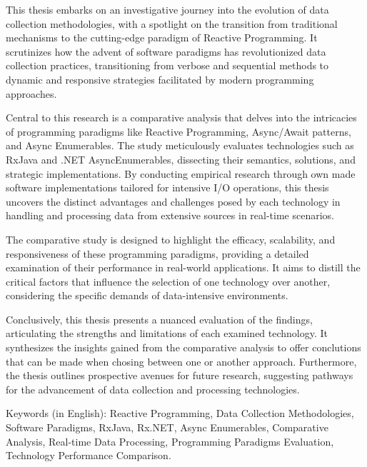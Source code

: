 \abstractEN %

This thesis embarks on an investigative journey into the evolution of data collection methodologies, with a spotlight on the transition from traditional mechanisms to the cutting-edge paradigm of Reactive Programming. It scrutinizes how the advent of software paradigms has revolutionized data collection practices, transitioning from verbose and sequential methods to dynamic and responsive strategies facilitated by modern programming approaches.

Central to this research is a comparative analysis that delves into the intricacies of programming paradigms like Reactive Programming, Async/Await patterns, and Async Enumerables. The study meticulously evaluates technologies such as RxJava and .NET AsyncEnumerables, dissecting their semantics, solutions, and strategic implementations. By conducting empirical research through own made software implementations tailored for intensive I/O operations, this thesis uncovers the distinct advantages and challenges posed by each technology in handling and processing data from extensive sources in real-time scenarios.

The comparative study is designed to highlight the efficacy, scalability, and responsiveness of these programming paradigms, providing a detailed examination of their performance in real-world applications. It aims to distill the critical factors that influence the selection of one technology over another, considering the specific demands of data-intensive environments.

Conclusively, this thesis presents a nuanced evaluation of the findings, articulating the strengths and limitations of each examined technology. It synthesizes the insights gained from the comparative analysis to offer conclutions that can be made when chosing between one or another approach. Furthermore, the thesis outlines prospective avenues for future research, suggesting pathways for the advancement of data collection and processing technologies.


\begin{keywords}
    Keywords (in English): Reactive Programming, Data Collection Methodologies, Software Paradigms, RxJava, Rx.NET, Async Enumerables, Comparative Analysis, Real-time Data Processing, Programming Paradigms Evaluation, Technology Performance Comparison.
\end{keywords}
